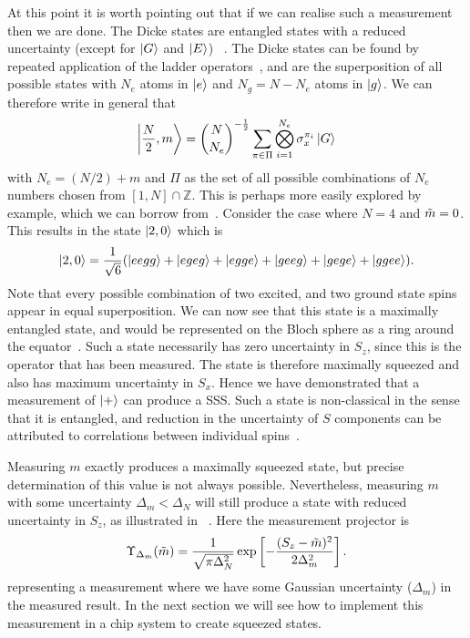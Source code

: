 At this point it is worth pointing out that if we can realise such a
measurement then we are done. The Dicke states are entangled states with a
reduced uncertainty (except for $\ket{G}$ and $\ket{E}$)
~\cite{PhysRevA.83.013821}. The Dicke states can be found by repeated
application of the ladder operators~\cite{Binney}, and are the superposition
of all possible states with $N_e$ atoms in $\ket{e}$ and $N_g = N - N_e$ atoms
in $\ket{g}$. We can therefore write in general that
%
\begin{equation}
  \ket{\frac{N}{2}, m} = \binom{N}{N_e}^{-\frac{1}{2}}\sum_{\pi \in \Pi}
  \bigotimes_{i=1}^{N_e} \sigma_x^{\pi_i} \ket{G}
\end{equation}
%
with $N_e=(N/2)+m$ and $\Pi$ as the set of all possible combinations of $N_e$
numbers chosen from $[1, N]\cap\mathbb{Z}$.
%
This is perhaps more easily explored by example, which we can 
borrow from~. Consider the case where
$N=4$ and $\tilde{m}=0$. This results in the state $\ket{2, 0}$ which is
%
\begin{equation}
  \ket{2,0} = \frac{1}{\sqrt{6}}(\ket{eegg} + \ket{egeg} + \ket{egge} +
  \ket{geeg} + \ket{gege} + \ket{ggee}).
\end{equation}
%
Note that every possible combination of two excited, and two ground state spins
appear in equal superposition. We can now see that this state is a maximally
entangled state, and would be represented on the Bloch sphere as a ring around
the equator~\cite{Cox2016}.
%
Such a state necessarily has zero uncertainty in $S_z$, since this is the
operator that has been measured. The state is therefore maximally squeezed and
also has maximum uncertainty in $S_x$.  Hence we have demonstrated that a
measurement of $\ket{+}$ can produce a SSS. Such a state is non-classical in
the sense that it is entangled, and reduction in the uncertainty of $S$
components can be attributed to correlations between individual
spins~\cite{Cox2016}.

Measuring $m$ exactly produces a maximally squeezed state, but precise
determination of this value is not always possible. Nevertheless, measuring $m$
with some uncertainty $\Delta_m < \Delta_N$ will still produce a state with
reduced uncertainty in $S_z$, as illustrated in
~\cite{PhysRevA.47.3554}. Here the measurement
projector is ~\cite{Vanner16182, Bao2020}
%
\begin{equation}
  \Upsilon_{\Delta_m}(\tilde{m}) = \frac{1}{\sqrt{\pi\Delta_N^2}}\exp\left[
    -\frac{(S_z-\tilde{m})^2}{2\Delta_m^2}\right].
  \label{squeeze:eqn:squeezeproj}
\end{equation}
%
representing a measurement where we have some Gaussian uncertainty
($\Delta_m$) in the measured result.  In the next section we will see how
to implement this measurement in a \CaF{} chip system to create squeezed
states.

